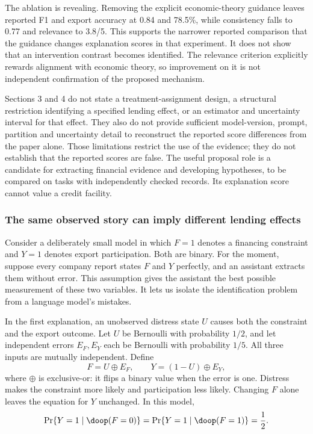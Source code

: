 The ablation is revealing. Removing the explicit economic-theory guidance
leaves reported F1 and export accuracy at 0.84 and 78.5\%, while consistency
falls to 0.77 and relevance to 3.8/5. This supports the narrower reported
comparison that the guidance changes explanation scores in that experiment.
It does not show that an intervention contrast becomes identified. The
relevance criterion explicitly rewards alignment with economic theory, so
improvement on it is not independent confirmation of the proposed mechanism.
\citep[Sections 4.2.2--4.6; Tables 1--2]{rel18li}

Sections 3 and 4 do not state a treatment-assignment design, a structural
restriction identifying a specified lending effect, or an estimator and
uncertainty interval for that effect. They also do not provide sufficient
model-version, prompt, partition and uncertainty detail to reconstruct the
reported score differences from the paper alone. Those limitations restrict
the use of the evidence; they do not establish that the reported scores are
false. The useful proposal role is a candidate for extracting financial
evidence and developing hypotheses, to be compared on tasks with independently
checked records. Its explanation score cannot value a credit facility.

\subsubsection{The same observed story can imply different lending effects}

Consider a deliberately small model in which $F=1$ denotes a financing
constraint and $Y=1$ denotes export participation. Both are binary. For the
moment, suppose every company report states $F$ and $Y$ perfectly, and an
assistant extracts them without error. This assumption gives the assistant
the best possible measurement of these two variables. It lets us isolate the
identification problem from a language model's mistakes.

In the first explanation, an unobserved distress state $U$ causes both the
constraint and the export outcome. Let $U$ be Bernoulli with probability
$1/2$, and let independent errors $E_F,E_Y$ each be Bernoulli with probability
$1/5$. All three inputs are mutually independent. Define
\begin{equation}
 F=U\mathbin{\oplus}E_F,\qquad
 Y=(1-U)\mathbin{\oplus}E_Y,
 \label{closure30:confounded}
\end{equation}
where $\oplus$ is exclusive-or: it flips a binary value when the error is one.
Distress makes the constraint more likely and participation less likely.
Changing $F$ alone leaves the equation for $Y$ unchanged. In this model,
\begin{equation}
 \Pr\{Y=1\mid\doop(F=0)\}
 =\Pr\{Y=1\mid\doop(F=1)\}=\frac12.
 \label{closure30:noeffect}
\end{equation}

